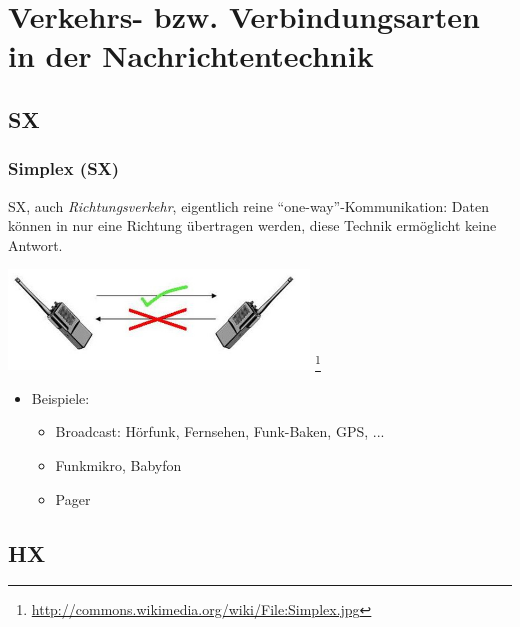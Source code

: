 \section[Verkehrsarten]{Verkehrs- bzw. Verbindungsarten in der Nachrichtentechnik}

\subsection{SX}

\begin{frame}
    \frametitle{Simplex (SX)}

    SX, auch \emph{Richtungsverkehr}, eigentlich reine
    ``one-way''-Kommunikation: Daten können in nur eine Richtung übertragen
    werden, diese Technik ermöglicht keine Antwort.

    \begin{center}
        \includegraphics[width=0.6\textwidth]{bv11/Simplex.jpg}
        \footnote{\tiny \url{http://commons.wikimedia.org/wiki/File:Simplex.jpg}}
    \end{center}

    \begin{itemize}
        \item Beispiele:
        \begin{itemize}
            \item Broadcast: Hörfunk, Fernsehen, Funk-Baken, GPS, ...
            \item Funkmikro, Babyfon
            \item Pager
        \end{itemize}
    \end{itemize}

\end{frame}

\subsection{HX}

